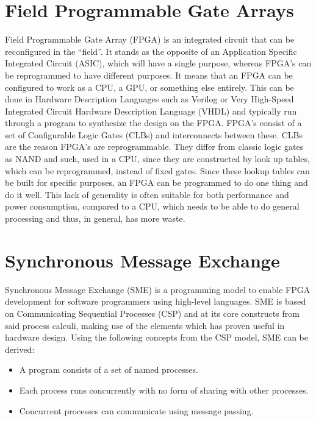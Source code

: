 \documentclass[a4paper, openany]{book}
\begin{document}
\begin{abstact}
\section{Field Programmable Gate Arrays}
\label{sec:org9f17e6c}
Field Programmable Gate Array (FPGA) is an integrated circuit that can be reconfigured in the ``field''. It stands as the opposite of an Application Specific Integrated Circuit (ASIC), which will have a single purpose, whereas FPGA's can be reprogrammed to have different purposes. It means that an FPGA can be configured to work as a CPU, a GPU, or something else entirely. This can be done in Hardware Description Languages such as Verilog or Very High-Speed Integrated Circuit Hardware Description Language (VHDL) and typically run through a program to synthesize the design on the FPGA.
FPGA's consist of a set of Configurable Logic Gates (CLBs) and interconnects between these. CLBs are the reason FPGA's are reprogrammable. They differ from classic logic gates as NAND and such, used in a CPU, since they are constructed by look up tables, which can be reprogrammed, instead of fixed gates. Since these lookup tables can be built for specific purposes, an FPGA can be programmed to do one thing and do it well. This lack of generality is often suitable for both performance and power consumption, compared to a CPU, which needs to be able to do general processing and thus, in general, has more waste.

\section{Synchronous Message Exchange}
\label{sec:SME}
Synchronous Message Exchange (SME) is a programming model to enable FPGA development for software programmers using high-level languages. SME is based on Communicating Sequential Processes (CSP) and at its core constructs from said process calculi, making use of the elements which has proven useful in hardware design\cite{sme}. Using the following concepts from the CSP model\cite{CSP}, SME can be derived:

\begin{itemize}
\item A program consists of a set of named processes.
\item Each process runs concurrently with no form of sharing with other processes.
\item Concurrent processes can communicate using message passing.
\end{itemize}


\end{abstact}
\end{document}
